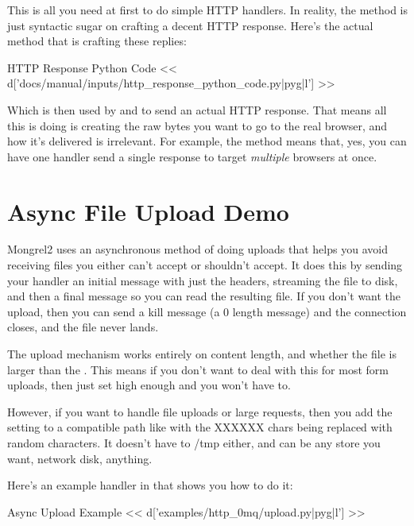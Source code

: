 This is all you need at first to do simple HTTP handlers.  In reality, the  method is
just syntactic sugar on crafting a decent HTTP response.  Here's the actual method that is crafting these replies:

\begin{code}{HTTP Response Python Code}
<< d['docs/manual/inputs/http_response_python_code.py|pyg|l'] >>
\end{code}

Which is then used by  and
 to send an actual HTTP response.  That
means all this is doing is creating the raw bytes you want to go
to the real browser, and how it's delivered is irrelevant.  For example,
the  method means that, yes, you can have one
handler send a single response to target \emph{multiple} browsers
at once.


\section{Async File Upload Demo}

Mongrel2 uses an asynchronous method of doing uploads that helps you 
avoid receiving files you either can't accept or shouldn't accept.  It does
this by sending your handler an initial message with just the headers, streaming
the file to disk, and then a final message so you can read the resulting file.
If you don't want the upload, then you can send a kill message (a 0 length message)
and the connection closes, and the file never lands.

The upload mechanism works entirely on content length, and whether the file
is larger than the .  This means if you don't
want to deal with this for most form uploads, then just set 
high enough and you won't have to.

However, if you want to handle file uploads or large requests, then you add
the setting  to a  compatible path
like  with the XXXXXX chars being replaced
with random characters.  It doesn't have to /tmp either, and can be any store
you want, network disk, anything.

Here's an example handler in  that shows
you how to do it:

\begin{code}{Async Upload Example}
<< d['examples/http_0mq/upload.py|pyg|l'] >>
\end{code}

